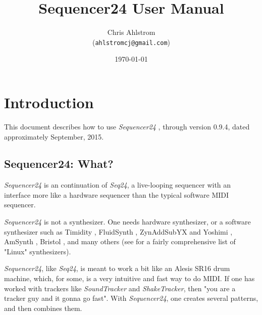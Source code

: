 \documentclass[
 11pt,
 twoside,
 a4paper,
 headinclude,
 footinclude,
 final                                 %
]{article}
\begin{document}
\title{Sequencer24 User Manual}
\author{Chris Ahlstrom\\
   (\texttt{ahlstromcj@gmail.com})}
\date{\today}
\maketitle
\tableofcontents
\listoffigures                         %


\setlength{\parindent}{0pt}
\setlength{\parskip}{1ex plus 0.5ex minus 0.2ex}

\section{Introduction}
\label{sec:introduction}

   This document describes how to use \textsl{Sequencer24} \cite{seq24},
   through version 0.9.4, dated approximately September, 2015.

\subsection{Sequencer24: What?}
\label{subsec:what_is_seqeuncer24}

   \textsl{Sequencer24} is an continuation of \textsl{Seq24},
   a live-looping sequencer with an interface more like a hardware sequencer
   than the typical software MIDI sequencer.

   \textsl{Sequencer24} is not a synthesizer.  One needs hardware
   synthesizer, or a software synthesizer such as Timidity \cite{timidity},
   FluidSynth \cite{fluidsynth}, ZynAddSubYX \cite{zynaddsubfx} and Yoshimi
   \cite{yoshimi} \cite{yoshimi2}, AmSynth \cite{amsynth}, Bristol
   \cite{bristol}, and many others (see \cite{linuxsynths} for a fairly
   comprehensive list of "Linux" synthesizers).

   \textsl{Sequencer24}, like \textsl{Seq24},
   is meant to work a bit like an Alesis SR16 drum machine,
   which, for some, is a very intuitive and fast way to do MIDI.
   If one has worked with trackers like \textsl{SoundTracker} and
   \textsl{ShakeTracker}, then "you are a tracker guy and it gonna go fast".
   With \textsl{Sequencer24}, one creates several patterns, and then
   combines them.
\end{document}
